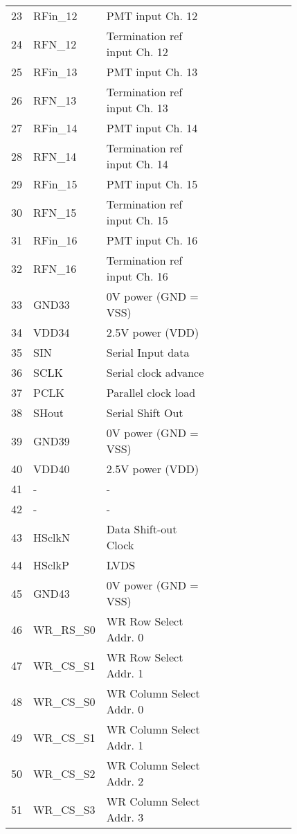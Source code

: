 \begin{footnotesize}
\begin{center}
\begin{longtabu}{  | c | p{0.12\linewidth} | p{0.4\linewidth} | p{0.3\linewidth} |}
23	& RFin\_12	& PMT input Ch. 12	& \\
24	& RFN\_12	& Termination ref input Ch. 12	& \\
25	& RFin\_13	& PMT input Ch. 13	& \\
26	& RFN\_13	& Termination ref input Ch. 13	& \\
27	& RFin\_14	& PMT input Ch. 14	& \\
28	& RFN\_14	& Termination ref input Ch. 14	& \\
29	& RFin\_15	& PMT input Ch. 15	& \\
30	& RFN\_15	& Termination ref input Ch. 15	& \\
31	& RFin\_16	& PMT input Ch. 16	& \\
32	& RFN\_16	& Termination ref input Ch. 16	& \\
 33	& GND33		& 0V power (GND = VSS)	& \\
 34	& VDD34		& 2.5V power (VDD)	& \\
 35	& SIN		& Serial Input data	& \\
 36	& SCLK		& Serial clock advance	& \\
 37	& PCLK		& Parallel clock load	& \\
 38	& SHout	& Serial Shift Out	& \\
 39	& GND39		& 0V power (GND = VSS)	& \\
 40	& VDD40		& 2.5V power (VDD)	& \\
41	& -			& - 	& \\
42	& -			& -		& \\
 43	& HSclkN	& Data Shift-out Clock	& \\
 44	& HSclkP	& LVDS	& \\
 45	& GND43		& 0V power (GND = VSS)	& \\
 46	& WR\_RS\_S0	& WR Row Select Addr. 0	& \\
 47	& WR\_CS\_S1	& WR Row Select Addr. 1	& \\
 48	& WR\_CS\_S0	& WR Column Select Addr. 0	& \\
 49	& WR\_CS\_S1	& WR Column Select Addr. 1	& \\
 50	& WR\_CS\_S2	& WR Column Select Addr. 2	& \\
 51	& WR\_CS\_S3	& WR Column Select Addr. 3	& \\

\end{longtabu}
\end{center}
\end{footnotesize}
